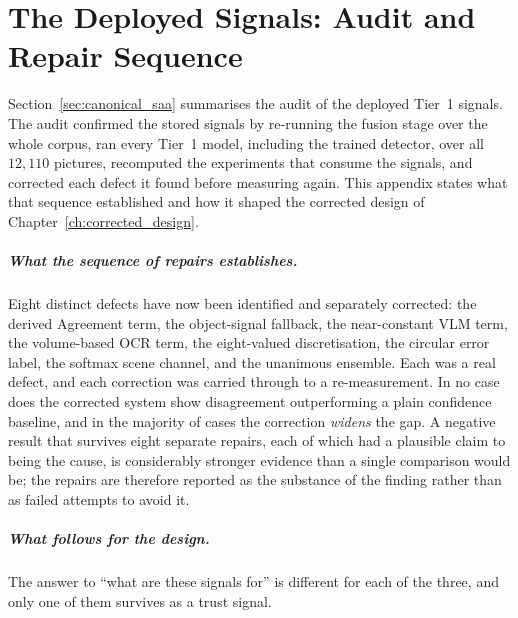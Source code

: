 \documentclass[12pt,a4paper]{report}
\begin{document}
\chapter{The Deployed Signals: Audit and Repair Sequence}
\label{app:audit_sequence}

Section~\ref{sec:canonical_saa} summarises the audit of the deployed Tier~1 signals. The audit confirmed the stored signals by re-running the fusion stage over the whole corpus, ran every Tier~1 model, including the trained detector, over all $12{,}110$ pictures, recomputed the experiments that consume the signals, and corrected each defect it found before measuring again. This appendix states what that sequence established and how it shaped the corrected design of Chapter~\ref{ch:corrected_design}.

\paragraph{What the sequence of repairs establishes.} Eight distinct defects have now been
identified and separately corrected: the derived Agreement term, the object-signal fallback, the
near-constant VLM term, the volume-based OCR term, the eight-valued discretisation, the circular
error label, the softmax scene channel, and the unanimous ensemble. Each was a real defect, and
each correction was carried through to a re-measurement. In no case does the corrected system
show disagreement outperforming a plain confidence baseline, and in the majority of cases the
correction \emph{widens} the gap. A negative result that survives eight separate repairs, each
of which had a plausible claim to being the cause, is considerably stronger evidence than a
single comparison would be; the repairs are therefore reported as the substance of
the finding rather than as failed attempts to avoid it.

\paragraph{What follows for the design.} The answer to ``what are these signals for'' is
different for each of the three, and only one of them survives as a trust signal.
\end{document}

